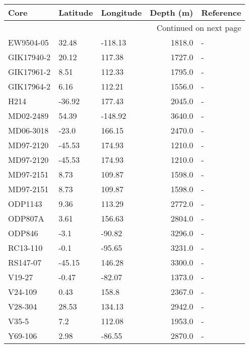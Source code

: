 \begin{longtable}{lllrl}

       Core & Latitude & Longitude &  Depth (m) & Reference \\

\endhead

\multicolumn{5}{r}{{Continued on next page}} \\

\endfoot


\endlastfoot
  EW9504-05 &    32.48 &   -118.13 &     1818.0 &         - \\
 GIK17940-2 &    20.12 &    117.38 &     1727.0 &         - \\
 GIK17961-2 &     8.51 &    112.33 &     1795.0 &         - \\
 GIK17964-2 &     6.16 &    112.21 &     1556.0 &         - \\
       H214 &   -36.92 &    177.43 &     2045.0 &         - \\
  MD02-2489 &    54.39 &   -148.92 &     3640.0 &         - \\
  MD06-3018 &    -23.0 &    166.15 &     2470.0 &         - \\
  MD97-2120 &   -45.53 &    174.93 &     1210.0 &         - \\
  MD97-2120 &   -45.53 &    174.93 &     1210.0 &         - \\
  MD97-2151 &     8.73 &    109.87 &     1598.0 &         - \\
  MD97-2151 &     8.73 &    109.87 &     1598.0 &         - \\
    ODP1143 &     9.36 &    113.29 &     2772.0 &         - \\
    ODP807A &     3.61 &    156.63 &     2804.0 &         - \\
     ODP846 &     -3.1 &    -90.82 &     3296.0 &         - \\
   RC13-110 &     -0.1 &    -95.65 &     3231.0 &         - \\
   RS147-07 &   -45.15 &    146.28 &     3300.0 &         - \\
     V19-27 &    -0.47 &    -82.07 &     1373.0 &         - \\
    V24-109 &     0.43 &     158.8 &     2367.0 &         - \\
    V28-304 &    28.53 &    134.13 &     2942.0 &         - \\
      V35-5 &      7.2 &    112.08 &     1953.0 &         - \\
    Y69-106 &     2.98 &    -86.55 &     2870.0 &         - \\
\end{longtable}
